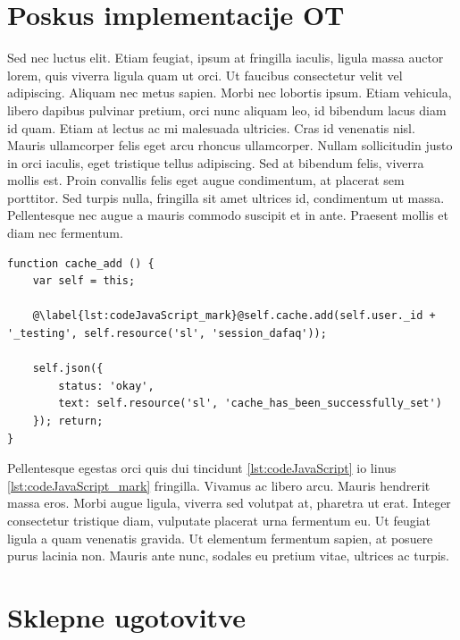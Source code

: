 \documentclass[a4paper, 12pt, twoside]{book}
\begin{document}
\chapter{Poskus implementacije OT}

Sed nec luctus elit. Etiam feugiat, ipsum at fringilla iaculis, ligula massa auctor lorem, quis viverra ligula quam ut orci. Ut faucibus consectetur velit vel adipiscing. Aliquam nec metus sapien. Morbi nec lobortis ipsum. Etiam vehicula, libero dapibus pulvinar pretium, orci nunc aliquam leo, id bibendum lacus diam id quam. Etiam at lectus ac mi malesuada ultricies. Cras id venenatis nisl. Mauris ullamcorper felis eget arcu rhoncus ullamcorper. Nullam sollicitudin justo in orci iaculis, eget tristique tellus adipiscing. Sed at bibendum felis, viverra mollis est. Proin convallis felis eget augue condimentum, at placerat sem porttitor. Sed turpis nulla, fringilla sit amet ultrices id, condimentum ut massa. Pellentesque nec augue a mauris commodo suscipit et in ante. Praesent mollis et diam nec fermentum.

\begin{lstlisting}[caption={Interdum pretium}, label={lst:codeJavaScript}, title={Exampelus \ref{lst:codeJavaScript}: Interdum pretium}]
function cache_add () {
	var self = this;

	@\label{lst:codeJavaScript_mark}@self.cache.add(self.user._id + '_testing', self.resource('sl', 'session_dafaq'));

	self.json({
		status: 'okay',
		text: self.resource('sl', 'cache_has_been_successfully_set')
	}); return;
}
\end{lstlisting}

Pellentesque egestas orci quis dui tincidunt \ref{lst:codeJavaScript} io linus \ref{lst:codeJavaScript_mark} fringilla. Vivamus ac libero arcu. Mauris hendrerit massa eros. Morbi augue ligula, viverra sed volutpat at, pharetra ut erat. Integer consectetur tristique diam, vulputate placerat urna fermentum eu. Ut feugiat ligula a quam venenatis gravida. Ut elementum fermentum sapien, at posuere purus lacinia non. Mauris ante nunc, sodales eu pretium vitae, ultrices ac turpis.

\chapter{Sklepne ugotovitve}
\end{document}
